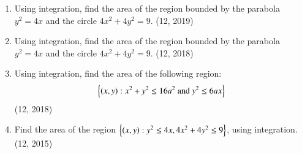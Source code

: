 \begin{enumerate}[label=\thesubsection.\arabic*,ref=\thesubsection.\theenumi]
%
\item Using integration, find the area of the region bounded by the parabola $y^{2}=4x$ and the circle $4x^{2}+4y^{2}=9$. \hfill (12, 2019)
\item Using integration, find the area of the region bounded by the parabola $y^{2}=4x$ and the circle $4x^{2}+4y^{2}=9$. \hfill (12, 2018)
\item Using integration, find the area of the following region:
  \begin{align*}
  \left\{\left(x,y\right):x^{2}+y^{2}\leq 16a^{2} ~\text{and}~ y^{2}\leq 6ax\right\}
  \end{align*}
  \hfill (12, 2018)
\item Find the area of the region $\left\{\left(x,y\right) : y^2 \leq 4x, 4x^2+4y^2 \leq 9\right\}$, using integration.
\hfill (12, 2015)
\end{enumerate}
